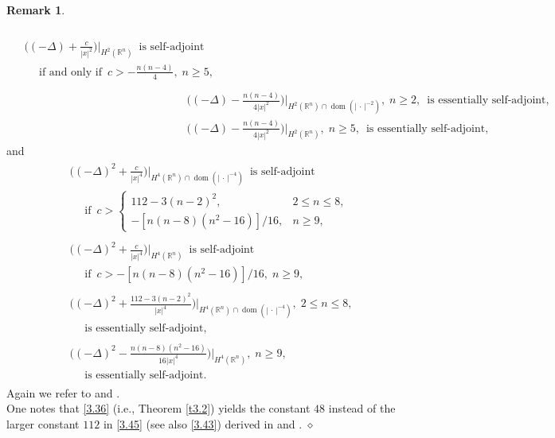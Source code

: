 \documentclass[reqno,11pt,centertags]{amsart}
\newcommand{\bbR}{{\mathbb{R}}}
\newcommand{\<}{\langle}
\renewcommand{\>}{\rangle}
\newcommand{\lb}{\label}
\newcommand{\f}{\frac}
\newcommand{\dott}{\,\cdot\,}
\newcommand{\dom}{\operatorname{dom}}
\numberwithin{equation}{section}
\theoremstyle{definition}
\newtheorem{remark}[theorem]{Remark}
\begin{document}
\begin{remark}
\begin{align}
\begin{split}
\end{split} \\
\begin{split} 
& \bigg((-\Delta) + \f{c}{|x|^2}\bigg)\bigg|_{H^2(\bbR^n)} \, \text{ is self-adjoint}     \lb{3.40} \\
& \quad \text{ if and only if } \, c > - \f{n(n-4)}{4}, \; n \geq 5,    \\
\end{split} \\
& \bigg((-\Delta) - \f{n(n-4)}{4|x|^2}\bigg)\bigg|_{H^2(\bbR^n)\cap\dom(|\dott|^{-2})}, \; n \geq  2, \, \text{ is essentially self-adjoint,}    \lb{3.41} \\
& \bigg((-\Delta) - \f{n(n-4)}{4|x|^2}\bigg)\bigg|_{H^2(\bbR^n)}, \; n \geq  5, \, \text{ is essentially self-adjoint,}    \lb{3.42}
\end{align}
and 
\begin{align}
\begin{split}
& \bigg((-\Delta)^2 + \f{c}{|x|^4}\bigg)\bigg|_{H^4(\bbR^n)\cap\dom(|\dott|^{-4})} \, \text{ is self-adjoint}    \lb{3.43} \\
& \quad \text{ if } \, c > \begin{cases} 112 - 3(n-2)^2, & 2\leq n \leq 8, \\
- [n(n-8)(n^2-16)]/16, & n \geq 9,    
\end{cases} 
\end{split} \\
\begin{split}
& \bigg((-\Delta)^2 + \f{c}{|x|^4}\bigg)\bigg|_{H^4(\bbR^n)} \, \text{ is self-adjoint}    \lb{3.44} \\
& \quad \text{ if } \, c > - [n(n-8)(n^2-16)]/16, \;  n \geq 9,    
\end{split} \\
\begin{split}
& \bigg((-\Delta)^2 + \f{112 - 3(n-2)^2}{|x|^4}\bigg)\bigg|_{H^4(\bbR^n)\cap\dom(|\dott|^{-4})}, \; 2 \leq n \leq 8,   \lb{3.45} \\ 
& \quad \text{ is essentially self-adjoint,} 
\end{split} \\
\begin{split}
& \bigg((-\Delta)^2 - \f{n(n-8)(n^2-16)}{16|x|^4}\bigg)\bigg|_{H^4(\bbR^n)}, \; n \geq 9,    \lb{3.46} \\ 
& \quad \text{ is essentially self-adjoint.} 
\end{split} 
\end{align}
Again we refer to \cite{OTY11} and \cite{Ta10}. \\[1mm] 
\noindent 
One notes that \eqref{3.36} (i.e., Theorem \ref{t3.2}) yields the constant $48$ instead of the larger constant $112$ in \eqref{3.45} (see also \eqref{3.43}) derived in \cite{OTY11} and \cite{Ta10}. \hfill $\diamond$
\end{remark}
\end{document}
